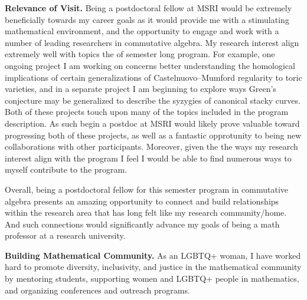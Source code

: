 \documentclass[11pt,reqno]{amsart}
\theoremstyle{remark}
\begin{document}
\noindent \textbf{Relevance of Visit.} Being a postdoctoral fellow at MSRI would be extremely beneficially towards my career goals as it would provide me with a stimulating mathematical environment, and the opportunity to engage and work with a number of leading researchers in commutative algebra. My research interest align extremely well with topics the of semester long program. For example, one ongoing project I am working on concerns better understanding the homological implications of certain generalizations of Castelnuovo--Mumford regularity to toric varieties, and in a separate project I am beginning to explore ways Green's conjecture may be generalized to describe the syzygies of canonical stacky curves. Both of these projects touch upon many of the topics included in the program description. As such begin a postdoc at MSRI would likely prove valuable toward progressing both of these projects, as well as a fantastic opprotunity to being new collaborations with other participants. Moreover, given the the ways my research interest align with the program I feel I would be able to find numerous ways to myself contribute to the program.%

Overall, being a postdoctoral fellow for this semester program in commutative algebra presents an amazing opportunity to connect and build relationships within the research area that has long felt like my research community/home. And such connections would significantly advance my goals of being a math professor at a research university.





\noindent \textbf{Building Mathematical Community.} As an LGBTQ+ woman, I have worked hard to promote diversity, inclusivity, and justice in the mathematical community by mentoring students, supporting women and LGBTQ+ people in mathematics, and organizing conferences and outreach programs. %
\end{document}
